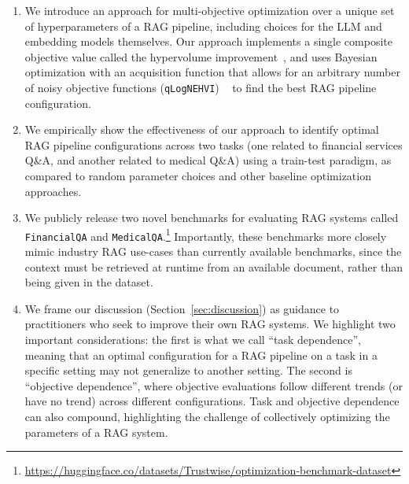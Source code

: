 \begin{enumerate}
    \item[(1)] We introduce an approach for multi-objective optimization over a unique set of hyperparameters of a RAG pipeline, including choices for the LLM and embedding models themselves. Our approach implements a single composite objective value called the hypervolume improvement~\citep{guerreiro2021hypervolume}, and uses Bayesian optimization with an acquisition function that allows for an arbitrary number of noisy objective functions (\texttt{qLogNEHVI}) ~\citep{daulton2021parallel, ament2023unexpected} to find the best RAG pipeline configuration.
    
    \item[(2)] We empirically show the effectiveness of our approach to identify optimal RAG pipeline configurations across two tasks (one related to financial services Q\&A, and another related to medical Q\&A) using a train-test paradigm, as compared to random parameter choices and other baseline optimization approaches.

    \item[(3)] We publicly release two novel benchmarks for evaluating RAG systems called \texttt{FinancialQA} and \texttt{MedicalQA}.\footnote{\url{https://huggingface.co/datasets/Trustwise/optimization-benchmark-dataset}} Importantly, these benchmarks more closely mimic industry RAG use-cases than currently available benchmarks, since the context must be retrieved at runtime from an available document, rather than being given in the dataset.
    
    \item[(4)] We frame our discussion (Section~\ref{sec:discussion}) as guidance to practitioners who seek to improve their own RAG systems. We highlight two important considerations: the first is what we call ``task dependence'', meaning that an optimal configuration for a RAG pipeline on a task in a specific setting may not generalize to another setting. The second is ``objective dependence'', where objective evaluations follow different trends (or have no trend) across different configurations. Task and objective dependence can also compound, highlighting the challenge of collectively optimizing the parameters of a RAG system.
\end{enumerate}
